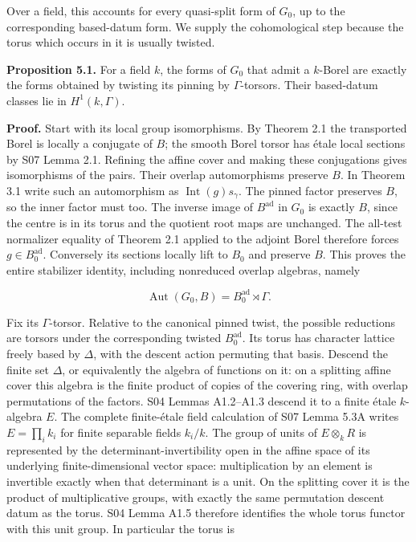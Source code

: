 \documentclass[11pt,a4paper,openany]{report}
\begin{document}
Over a field, this accounts for every quasi-split form of \(G_0\), up to the corresponding based-datum form. We supply the cohomological step because the torus which occurs in it is usually twisted.

\textbf{Proposition 5.1.} For a field \(k\), the forms of \(G_0\) that admit a \(k\)-Borel are exactly the forms obtained by twisting its pinning by \(\Gamma\)-torsors. Their based-datum classes lie in \(H^1(k,\Gamma)\).

\textbf{Proof.} Start with its local group isomorphisms. By Theorem 2.1 the transported Borel is locally a conjugate of \(B\); the smooth Borel torsor has étale local sections by S07 Lemma 2.1. Refining the affine cover and making these conjugations gives isomorphisms of the pairs. Their overlap automorphisms preserve \(B\). In Theorem 3.1 write such an automorphism as \(\operatorname{Int}(g)s_\gamma\). The pinned factor preserves \(B\), so the inner factor must too. The inverse image of \(B^{\mathrm{ad}}\) in \(G_0\) is exactly \(B\), since the centre is in its torus and the quotient root maps are unchanged. The all-test normalizer equality of Theorem 2.1 applied to the adjoint Borel therefore forces \(g\in B_0^{\mathrm{ad}}\). Conversely its sections locally lift to \(B_0\) and preserve \(B\). This proves the entire stabilizer identity, including nonreduced overlap algebras, namely

\[
\operatorname{Aut}(G_0,B)=B_0^{\mathrm{ad}}\rtimes\Gamma.
\]

Fix its \(\Gamma\)-torsor. Relative to the canonical pinned twist, the possible reductions are torsors under the corresponding twisted \(B_0^{\mathrm{ad}}\). Its torus has character lattice freely based by \(\Delta\), with the descent action permuting that basis. Descend the finite set \(\Delta\), or equivalently the algebra of functions on it: on a splitting affine cover this algebra is the finite product of copies of the covering ring, with overlap permutations of the factors. S04 Lemmas A1.2--A1.3 descend it to a finite étale \(k\)-algebra \(E\). The complete finite-étale field calculation of S07 Lemma 5.3A writes \(E=\prod_i k_i\) for finite separable fields \(k_i/k\). The group of units of \(E\otimes_k R\) is represented by the determinant-invertibility open in the affine space of its underlying finite-dimensional vector space: multiplication by an element is invertible exactly when that determinant is a unit. On the splitting cover it is the product of multiplicative groups, with exactly the same permutation descent datum as the torus. S04 Lemma A1.5 therefore identifies the whole torus functor with this unit group. In particular the torus is
\end{document}
